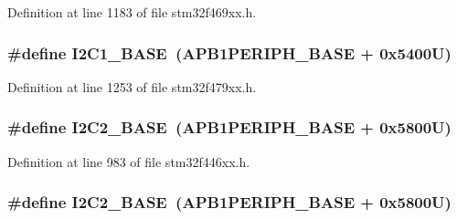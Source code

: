 Definition at line 1183 of file stm32f469xx.\+h.

\subsubsection[{\texorpdfstring{I2\+C1\+\_\+\+B\+A\+SE}{I2C1_BASE}}]{\setlength{\rightskip}{0pt plus 5cm}\#define I2\+C1\+\_\+\+B\+A\+SE~({\bf A\+P\+B1\+P\+E\+R\+I\+P\+H\+\_\+\+B\+A\+SE} + 0x5400\+U)}\hypertarget{group___peripheral__memory__map_gacd72dbffb1738ca87c838545c4eb85a3}{}\label{group___peripheral__memory__map_gacd72dbffb1738ca87c838545c4eb85a3}


Definition at line 1253 of file stm32f479xx.\+h.

\subsubsection[{\texorpdfstring{I2\+C2\+\_\+\+B\+A\+SE}{I2C2_BASE}}]{\setlength{\rightskip}{0pt plus 5cm}\#define I2\+C2\+\_\+\+B\+A\+SE~({\bf A\+P\+B1\+P\+E\+R\+I\+P\+H\+\_\+\+B\+A\+SE} + 0x5800\+U)}\hypertarget{group___peripheral__memory__map_ga04bda70f25c795fb79f163b633ad4a5d}{}\label{group___peripheral__memory__map_ga04bda70f25c795fb79f163b633ad4a5d}


Definition at line 983 of file stm32f446xx.\+h.

\subsubsection[{\texorpdfstring{I2\+C2\+\_\+\+B\+A\+SE}{I2C2_BASE}}]{\setlength{\rightskip}{0pt plus 5cm}\#define I2\+C2\+\_\+\+B\+A\+SE~({\bf A\+P\+B1\+P\+E\+R\+I\+P\+H\+\_\+\+B\+A\+SE} + 0x5800\+U)}\hypertarget{group___peripheral__memory__map_ga04bda70f25c795fb79f163b633ad4a5d}{}\label{group___peripheral__memory__map_ga04bda70f25c795fb79f163b633ad4a5d}


